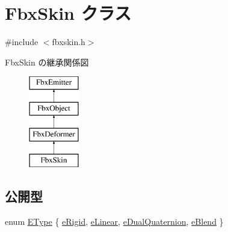 \hypertarget{class_fbx_skin}{}\section{Fbx\+Skin クラス}
\label{class_fbx_skin}


{\ttfamily \#include $<$fbxskin.\+h$>$}

Fbx\+Skin の継承関係図\begin{figure}[H]
\begin{center}
\leavevmode
\includegraphics[height=4.000000cm]{class_fbx_skin}
\end{center}
\end{figure}
\subsection*{公開型}
\begin{DoxyCompactItemize}
\item 
enum \hyperlink{class_fbx_skin_aee398789ebed22fa97269a26c6049a16}{E\+Type} \{ \hyperlink{class_fbx_skin_aee398789ebed22fa97269a26c6049a16a3113dda18b8784e09d60e0af60ac8f75}{e\+Rigid}, 
\hyperlink{class_fbx_skin_aee398789ebed22fa97269a26c6049a16add6c7b8a46adf0432f3c0e21986d5be8}{e\+Linear}, 
\hyperlink{class_fbx_skin_aee398789ebed22fa97269a26c6049a16a992d04fe41c48910271abdf4cde8c7d8}{e\+Dual\+Quaternion}, 
\hyperlink{class_fbx_skin_aee398789ebed22fa97269a26c6049a16af0f4a498471de5701994ed898252b864}{e\+Blend}
 \}
\end{DoxyCompactItemize}
